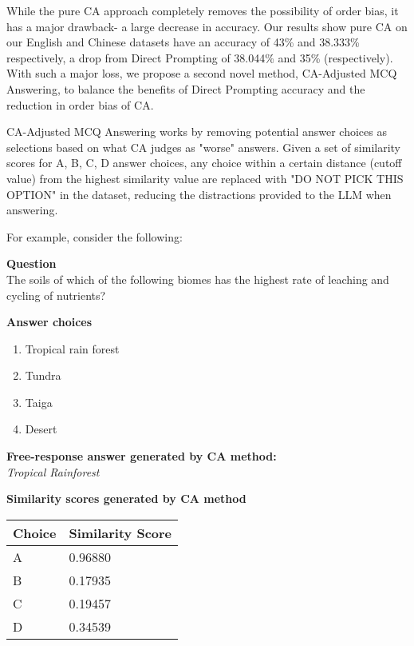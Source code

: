 While the pure CA approach completely removes the possibility of order bias, it has a major drawback- a large decrease in accuracy. Our results show pure CA on our English and Chinese datasets have an accuracy of 43\% and 38.333\% respectively, a drop from Direct Prompting of 38.044\% and 35\% (respectively). With such a major loss, we propose a second novel method, CA-Adjusted MCQ Answering, to balance the benefits of Direct Prompting accuracy and the reduction in order bias of CA.

CA-Adjusted MCQ Answering works by removing potential answer choices as selections based on what CA judges as "worse" answers. Given a set of similarity scores for A, B, C, D answer choices, any choice within a certain distance (cutoff value) from the highest similarity value are replaced with "DO NOT PICK THIS OPTION" in the dataset, reducing the distractions provided to the LLM when answering.

For example, consider the following:

\noindent\textbf{Question} \\
The soils of which of the following biomes has the highest rate of leaching and cycling of nutrients?

\vspace{0.5em}

\noindent\textbf{Answer choices}
\begin{enumerate}[label=\Alph*., itemsep=0pt, topsep=0pt]
    \item Tropical rain forest
    \item Tundra
    \item Taiga
    \item Desert
\end{enumerate}


\vspace{0.5em}

\noindent\textbf{Free-response answer generated by CA method:} \\
\textit{Tropical Rainforest}

\vspace{0.5em}

\noindent\textbf{Similarity scores generated by CA method}

\begin{center}
\begin{tabular}{@{}ll@{}}
\toprule
\textbf{Choice} & \textbf{Similarity Score} \\
\midrule
A & 0.96880 \\
B & 0.17935 \\
C & 0.19457 \\
D & 0.34539 \\
\bottomrule
\end{tabular}
\end{center}

